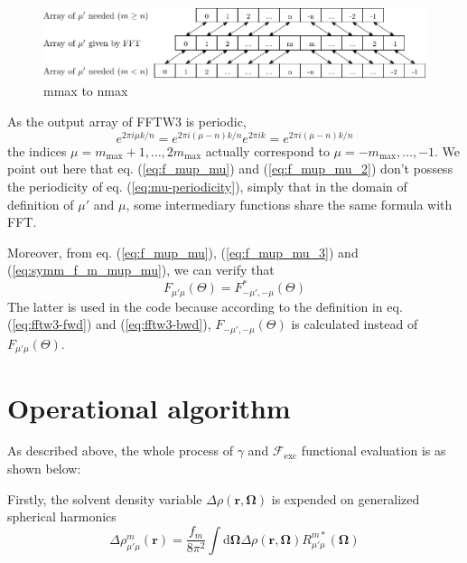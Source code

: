 \begin{figure}[h]
\centering{}%
\begin{minipage}[t]{1\textwidth}%
\begin{center}
\includegraphics[width=1\textwidth]{_figure/mmax_to_nmax}
\par\end{center}

\caption[mmax to nmax]{mmax to nmax\label{fig:FFTW3-2D-mmax_to_nmax}}
%
\end{minipage}
\end{figure}


As the output array of FFTW3 is periodic,
\begin{equation}
e^{2\pi i\mu k/n}=e^{2\pi i(\mu-n)k/n}e^{2\pi ik}=e^{2\pi i(\mu-n)k/n}\label{eq:mu-periodicity}
\end{equation}
the indices $\mu=m_{\mathrm{max}}+1,\ldots,2m_{\mathrm{max}}$ actually
correspond to $\mu=-m_{\mathrm{max}},\ldots,-1$. We point out here that eq. (\ref{eq:f_mup_mu}) and (\ref{eq:f_mup_mu_2})
don't possess the periodicity of eq. (\ref{eq:mu-periodicity}), simply that in
the domain of definition of $\mu'$ and $\mu$, some intermediary functions
share the same formula with FFT.

Moreover, from eq. (\ref{eq:f_mup_mu}), (\ref{eq:f_mup_mu_3}) and
(\ref{eq:symm_f_m_mup_mu}), we can verify that
\begin{equation}
F_{\mu'\mu}(\Theta)=F_{-\mu',-\mu}^{*}(\Theta)
\end{equation}
The latter is used in the code because according to the definition
in eq. (\ref{eq:fftw3-fwd}) and (\ref{eq:fftw3-bwd}), $F_{-\mu',-\mu}(\Theta)$
is calculated instead of $F_{\mu'\mu}(\Theta)$.


\section{Operational algorithm\label{sec:Operational-algorithm}}

As described above, the whole process of $\gamma$ and $\mathcal{F}_{\mathrm{exc}}$
functional evaluation is as shown below: 

Firstly, the solvent density variable $\Delta\rho(\mathbf{r},\mathbf{\Omega})$
is expended on generalized spherical harmonics %
\begin{equation}
\Delta\rho_{\mu'\mu}^{m}(\mathbf{r})=\frac{f_{m}}{8\pi^{2}}\int\mathrm{d}\mathbf{\Omega}\Delta\rho(\mathbf{r},\mathbf{\Omega})R_{\mu'\mu}^{m*}(\mathbf{\Omega})\label{eq:fgsht-fwd}
\end{equation}


